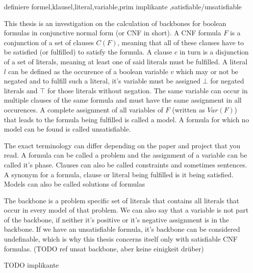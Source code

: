 definiere formel,klausel,literal,variable,prim implikante ,satisfiable/unsatisfiable

This thesis is an investigation on the calculation of backbones for boolean formulas in conjunctive normal form (or CNF in short). A CNF formula $F$ is a conjunction of a set of clauses $C(F)$, meaning that all of these clauses have to be satisfied (or fulfilled) to satisfy the formula. A clause $c$ in turn is a disjunction of a set of literals, meaning at least one of said literals must be fulfilled. A literal $l$ can be defined as the occurence of a boolean variable $v$ which may or not be negated and to fulfill such a literal, it's variable must be assigned $\bot$ for negated literals and $\top$ for those literals without negation. The same variable can occur in multiple clauses of the same formula and must have the same assignment in all occurences. A complete assignment of all variables of $F$ (written as $Var(F)$) that leads to the formula being fulfilled is called a model. A formula for which no model can be found is called unsatisfiable.

The exact terminology can differ depending on the paper and project that you read. A formula can be called a problem and the assignment of a variable can be called it's phase. Clauses can also be called constraints and sometimes sentences. A synonym for a formula, clause or literal being fulfilled is it being satisfied. Models can also be called solutions of formulas

The backbone is a problem specific set of literals that contains all literals that occur in every model of that problem. We can also say that a variable is not part of the backbone, if neither it's positive or it's negative assignment is in the backbone. If we have an unsatisfiable formula, it's backbone can be considered undefinable, which is why this thesis concerns itself only with satisfiable CNF formulas. (TODO ref unsat backbone, aber keine einigkeit drüber)

TODO implikante